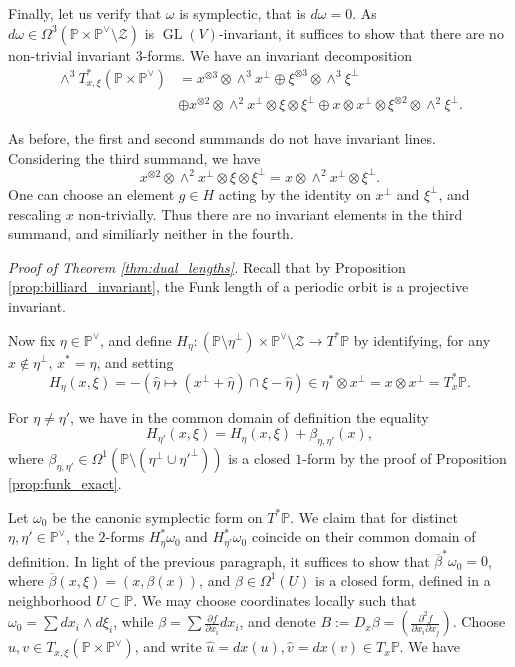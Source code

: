 \documentclass[reqno,10pt]{amsart}
\newcounter{mp}
\DeclareMathOperator{\GL}{GL}
\newcommand{\PP}{\mathbb{P}}
\begin{document}
Finally, let us verify that $\omega$ is symplectic, that is $d\omega=0$. As $d\omega\in\Omega^3(\mathbb P\times\mathbb P^\vee\setminus \mathcal Z)$ is $\GL(V)$-invariant, it suffices to show that there are no non-trivial invariant $3$-forms.
We have an invariant decomposition
\begin{align*}
	\wedge^3 T^*_{x,\xi}(\mathbb P\times\mathbb P^\vee)&=x^{\otimes 3}\otimes \wedge^3 x^\perp\oplus \xi^{\otimes 3}\otimes \wedge^3 \xi^\perp\\&\oplus x^{\otimes 2}\otimes \wedge^2 x^\perp \otimes \xi\otimes\xi^\perp\oplus x\otimes x^\perp \otimes  \xi^{\otimes 2}\otimes \wedge^2\xi^\perp.
	\end{align*}

As before, the first and second summands do not have invariant lines. Considering the third summand, we have 
$$  x^{\otimes 2}\otimes \wedge^2 x^\perp \otimes \xi\otimes\xi^\perp=x\otimes \wedge^2 x^\perp\otimes\xi^\perp .$$
One can choose an element $g\in H$ acting by the identity on $x^\perp$ and $\xi^\perp$, and rescaling $x$ non-trivially. Thus there are no invariant elements in the third summand, and similiarly neither in the fourth.\endproof

\textit{Proof of Theorem \ref{thm:dual_lengths}.} Recall that by Proposition \ref{prop:billiard_invariant}, the Funk length of a periodic orbit is a projective invariant.
 
Now fix $\eta\in\mathbb P^\vee$, and define $H_\eta:(\mathbb P\setminus \eta^\perp)\times \mathbb P^\vee\setminus \mathcal Z\to T^*\mathbb P$ by identifying, for any $x\notin\eta^\perp$, $x^*=\eta$, and setting \begin{equation}\label{eq:identification}H_\eta(x,\xi)=-\left(\hat\eta \mapsto (x^\perp+\hat \eta)\cap \xi -\hat\eta\right) \in \eta^*\otimes x^\perp=x\otimes x^\perp=T_x^*\mathbb P.\end{equation}

For $\eta\neq \eta'$, we have in the common domain of definition the equality $$H_{\eta'}(x,\xi)=H_\eta(x,\xi)+\beta_{\eta,\eta'}(x),$$ where $\beta_{\eta,\eta'}\in\Omega^1(\mathbb P\setminus(\eta^\perp\cup\eta'^\perp))$ is a closed $1$-form by the proof of Proposition \ref{prop:funk_exact}.

Let $\omega_0$ be the canonic symplectic form on $T^*\PP$. We claim that for distinct $\eta,\eta'\in\mathbb P^\vee$, the $2$-forms $H_\eta^*\omega_0$ and $H_{\eta'}^*\omega_0$ coincide on their common domain of definition. In light of the previous paragraph, it suffices to show that $\overline\beta^*\omega_0=0$, where $\overline\beta(x,\xi)=(x,\beta(x))$, and $\beta\in \Omega^1(U)$ is a closed form, defined in a neighborhood $U\subset\mathbb P$.  We may choose coordinates locally such that $\omega_0=\sum dx_i\wedge d\xi_i$, while $\beta=\sum \frac{\partial f}{\partial x_i}dx_i$, and denote $B:=D_x\beta=(\frac{\partial^2f}{\partial x_i\partial x_j})$. Choose $u,v\in T_{x,\xi}(\mathbb P\times \mathbb P^\vee)$, and write $\hat u=dx(u), \hat v=dx(v)\in T_x\mathbb P$. We have 
\end{document}
